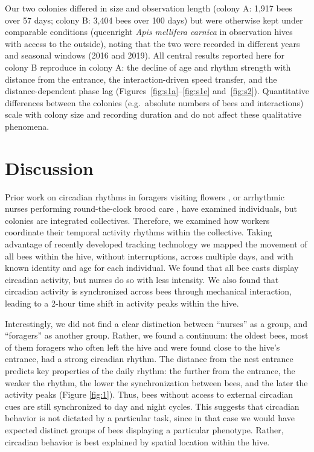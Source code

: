 \documentclass{article}
\newcommand{\added}[1]{{\color{blue}#1}}
\newcommand{\added}[1]{#1}
\begin{document}
\added{Our two colonies differed in size and observation length (colony A: 1{,}917 bees over 57 days; colony B: 3{,}404 bees over 100 days) but were otherwise kept under comparable conditions (queenright \textit{Apis mellifera carnica} in observation hives with access to the outside), noting that the two were recorded in different years and seasonal windows (2016 and 2019). All central results reported here for colony B reproduce in colony A: the decline of age and rhythm strength with distance from the entrance, the interaction-driven speed transfer, and the distance-dependent phase lag (Figures~\ref{fig:s1a}--\ref{fig:s1e} and~\ref{fig:s2}). Quantitative differences between the colonies (e.g.\ absolute numbers of bees and interactions) scale with colony size and recording duration and do not affect these qualitative phenomena.}

\section{Discussion}
Prior work on circadian rhythms in foragers visiting flowers \cite{von_frisch_tanze_1965}, or arrhythmic nurses performing round-the-clock brood care \cite{moore_timekeeping_1998, bloch_reversal_2001}, have examined individuals, but colonies are integrated collectives. Therefore, we examined how workers coordinate their temporal activity rhythms within the collective. Taking advantage of recently developed tracking technology \cite{sixt_rendergan:_2018, wild_automatic_2018, boenisch_tracking_2018, wild_social_2021} we mapped the movement of all bees within the hive, without interruptions, across multiple days, and with known identity and age for each individual. We found that all bee casts display circadian activity, but nurses do so with less intensity. We also found that circadian activity is synchronized across bees through mechanical interaction, leading to a 2-hour time shift in activity peaks within the hive. 
 
Interestingly, we did not find a clear distinction between “nurses” as a group, and “foragers” as another group. Rather, we found a continuum: the oldest bees, most of them foragers who often left the hive and were found close to the hive’s entrance, had a strong circadian rhythm. The distance from the nest entrance predicts key properties of the daily rhythm: the further from the entrance, the weaker the rhythm, the lower the synchronization between bees, and the later the activity peaks (Figure \ref{fig:1}). Thus, bees without access to external circadian cues are still synchronized to day and night cycles. This suggests that circadian behavior is not dictated by a particular task, since in that case we would have expected distinct groups of bees displaying a particular phenotype. Rather, circadian behavior is best explained by spatial location within the hive.  
\end{document}
